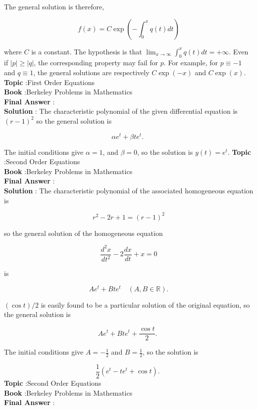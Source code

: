 \documentclass[10pt]{article}
\begin{document}
The general solution is therefore,

$$
f(x)=C \exp \left(-\int_{0}^{x} q(t) d t\right)
$$

where $C$ is a constant. The hypothesis is that $\lim _{x \rightarrow \infty} \int_{0}^{x} q(t) d t=+\infty$. Even if $|p| \geqslant|q|$, the corresponding property may fail for $p$. For example, for $p \equiv-1$ and $q \equiv 1$, the general solutions are respectively $C \exp (-x)$ and $C \exp (x)$.
\textbf{Topic} :First Order Equations \\
\textbf{Book} :Berkeley Problems in Mathematics\\
\textbf{Final Answer} :\\


\textbf{Solution} : The characteristic polynomial of the given differential equation is $(r-1)^{2}$ so the general solution is

$$
\alpha e^{t}+\beta t e^{t} \text {. }
$$

The initial conditions give $\alpha=1$, and $\beta=0$, so the solution is $y(t)=e^{t}$.
\textbf{Topic} :Second Order Equations \\
\textbf{Book} :Berkeley Problems in Mathematics\\
\textbf{Final Answer} :\\


\textbf{Solution} : The characteristic polynomial of the associated homogeneous equation is

$$
r^{2}-2 r+1=(r-1)^{2}
$$

so the general solution of the homogeneous equation

$$
\frac{d^{2} x}{d t^{2}}-2 \frac{d x}{d t}+x=0
$$

is

$$
A e^{t}+B t e^{t} \quad(A, B \in \mathbb{R}) .
$$

$(\cos t) / 2$ is easily found to be a particular solution of the original equation, so the general solution is

$$
A e^{t}+B t e^{t}+\frac{\cos t}{2} \text {. }
$$

The initial conditions give $A=-\frac{1}{2}$ and $B=\frac{1}{2}$, so the solution is

$$
\frac{1}{2}\left(e^{t}-t e^{t}+\cos t\right) \text {. }
$$
\textbf{Topic} :Second Order Equations \\
\textbf{Book} :Berkeley Problems in Mathematics\\
\textbf{Final Answer} :\\
\end{document}
